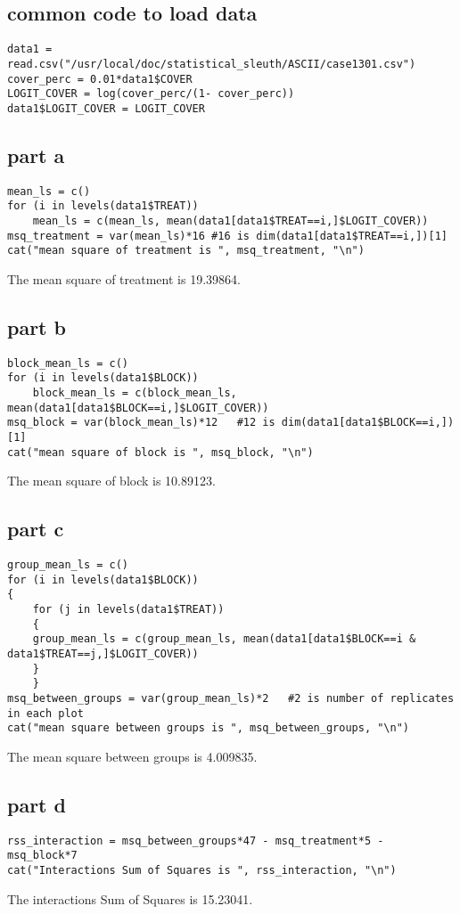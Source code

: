 \documentclass[a4paper,10pt]{article}
\begin{document}
\subsection{common code to load data}
\begin{verbatim}
data1 = read.csv("/usr/local/doc/statistical_sleuth/ASCII/case1301.csv")
cover_perc = 0.01*data1$COVER
LOGIT_COVER = log(cover_perc/(1- cover_perc))
data1$LOGIT_COVER = LOGIT_COVER
\end{verbatim}

\subsection{part a}
\begin{verbatim}
mean_ls = c()
for (i in levels(data1$TREAT))
	mean_ls = c(mean_ls, mean(data1[data1$TREAT==i,]$LOGIT_COVER))
msq_treatment = var(mean_ls)*16	#16 is dim(data1[data1$TREAT==i,])[1]
cat("mean square of treatment is ", msq_treatment, "\n")
\end{verbatim}
The mean square of treatment is 19.39864.

\subsection{part b}
\begin{verbatim}
block_mean_ls = c()
for (i in levels(data1$BLOCK))
	block_mean_ls = c(block_mean_ls, mean(data1[data1$BLOCK==i,]$LOGIT_COVER))
msq_block = var(block_mean_ls)*12	#12 is dim(data1[data1$BLOCK==i,])[1]
cat("mean square of block is ", msq_block, "\n")
\end{verbatim}
The mean square of block is 10.89123.

\subsection{part c}
\begin{verbatim}
group_mean_ls = c()
for (i in levels(data1$BLOCK))
{
	for (j in levels(data1$TREAT))
	{
	group_mean_ls = c(group_mean_ls, mean(data1[data1$BLOCK==i & data1$TREAT==j,]$LOGIT_COVER))
	}
	}
msq_between_groups = var(group_mean_ls)*2	#2 is number of replicates in each plot
cat("mean square between groups is ", msq_between_groups, "\n")
\end{verbatim}
The mean square between groups is 4.009835.

\subsection{part d}
\begin{verbatim}
rss_interaction = msq_between_groups*47 - msq_treatment*5 - msq_block*7
cat("Interactions Sum of Squares is ", rss_interaction, "\n")
\end{verbatim}
The interactions Sum of Squares is 15.23041.
\end{document}
